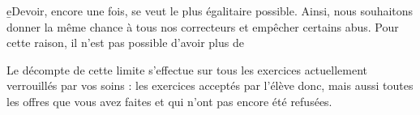 ﻿\b{eDevoir}, encore une fois, se veut le plus égalitaire possible. Ainsi, nous souhaitons donner la même chance à tous nos correcteurs et empêcher certains abus. Pour cette raison, il n’est pas possible d’avoir plus de %

Le décompte de cette limite s’effectue sur tous les exercices actuellement verrouillés par vos soins : les exercices acceptés par l’élève donc, mais aussi toutes les offres que vous avez faites et qui n’ont pas encore été refusées.